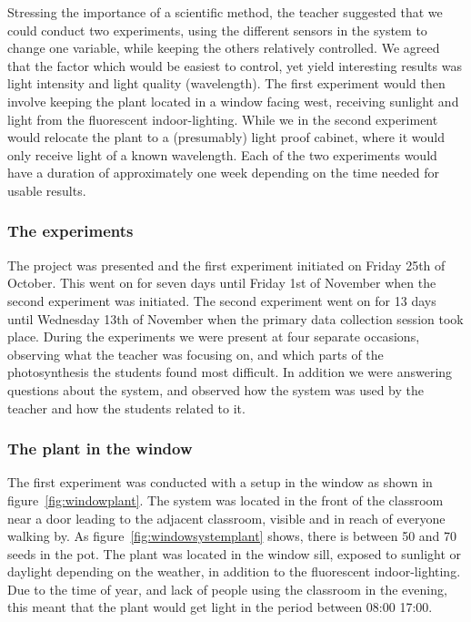 Stressing the importance of a scientific method, the teacher suggested that we could conduct two experiments, using the different sensors in the system to change one variable, while keeping the others relatively controlled. We agreed that the factor which would be easiest to control, yet yield interesting results was light intensity and light quality (wavelength). The first experiment would then involve keeping the plant located in a window facing west, receiving sunlight and light from the fluorescent indoor-lighting. While we in the second experiment would relocate the plant to a (presumably) light proof cabinet, where it would only receive light of a known wavelength. Each of the two experiments would have a duration of approximately one week depending on the time needed for usable results. 

\subsubsection{The experiments}
The project was presented and the first experiment initiated on Friday 25th of October. This went on for seven days until Friday 1st of November when the second experiment was initiated. The second experiment went on for 13 days until Wednesday 13th of November when the primary data collection session took place. During the experiments we were present at four separate occasions, observing what the teacher was focusing on, and which parts of the photosynthesis the students found most difficult. In addition we were answering questions about the system, and observed how the system was used by the teacher and how the students related to it. 

\subsubsection*{The plant in the window}
The first experiment was conducted with a setup in the window as shown in figure~\ref{fig:windowplant}. The system was located in the front of the classroom near a door leading to the adjacent classroom, visible and in reach of everyone walking by. As figure~\ref{fig:windowsystemplant} shows, there is between 50 and 70 seeds in the pot. The plant was located in the window sill, exposed to sunlight or daylight depending on the weather, in addition to the fluorescent indoor-lighting. Due to the time of year, and lack of people using the classroom in the evening, this meant that the plant would get light in the period between 08:00 17:00.

